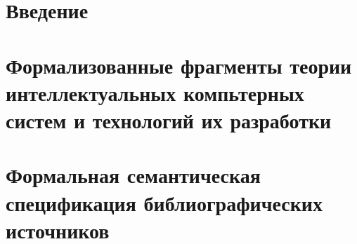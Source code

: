 \section*{Введение}


\newpage
\section{Формализованные фрагменты теории интеллектуальных компьтерных систем и технологий их разработки}


\newpage
\section{Формальная семантическая спецификация библиографических источников}

